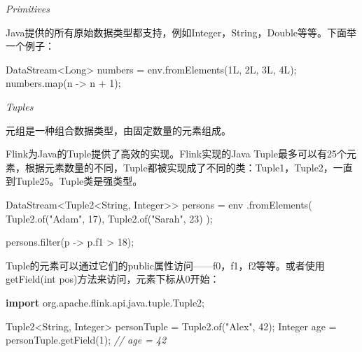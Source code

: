 \documentclass[cn,11pt,chinese]{elegantbook}
\newenvironment{Shaded}{}{}
\newcommand{\BuiltInTok}[1]{#1}
\newcommand{\CommentTok}[1]{\textcolor[rgb]{0.38,0.63,0.69}{\textit{#1}}}
\newcommand{\DecValTok}[1]{\textcolor[rgb]{0.25,0.63,0.44}{#1}}
\newcommand{\FunctionTok}[1]{\textcolor[rgb]{0.02,0.16,0.49}{#1}}
\newcommand{\ImportTok}[1]{#1}
\newcommand{\KeywordTok}[1]{\textcolor[rgb]{0.00,0.44,0.13}{\textbf{#1}}}
\newcommand{\NormalTok}[1]{#1}
\newcommand{\StringTok}[1]{\textcolor[rgb]{0.25,0.44,0.63}{#1}}
\begin{document}
\emph{Primitives}

Java提供的所有原始数据类型都支持，例如Integer，String，Double等等。下面举一个例子：

\begin{Shaded}
\begin{Highlighting}[]
\NormalTok{DataStream\textless{}}\BuiltInTok{Long}\NormalTok{\textgreater{} numbers = env.}\FunctionTok{fromElements}\NormalTok{(}\DecValTok{1L}\NormalTok{, }\DecValTok{2L}\NormalTok{, }\DecValTok{3L}\NormalTok{, }\DecValTok{4L}\NormalTok{);}
\NormalTok{numbers.}\FunctionTok{map}\NormalTok{(n {-}\textgreater{} n + }\DecValTok{1}\NormalTok{);}
\end{Highlighting}
\end{Shaded}

\emph{Tuples}

元组是一种组合数据类型，由固定数量的元素组成。

Flink为Java的Tuple提供了高效的实现。Flink实现的Java
Tuple最多可以有25个元素，根据元素数量的不同，Tuple都被实现成了不同的类：Tuple1，Tuple2，一直到Tuple25。Tuple类是强类型。

\begin{Shaded}
\begin{Highlighting}[]
\NormalTok{DataStream\textless{}Tuple2\textless{}}\BuiltInTok{String}\NormalTok{, }\BuiltInTok{Integer}\NormalTok{\textgreater{}\textgreater{} persons = env}
\NormalTok{  .}\FunctionTok{fromElements}\NormalTok{(}
\NormalTok{    Tuple2.}\FunctionTok{of}\NormalTok{(}\StringTok{"Adam"}\NormalTok{, }\DecValTok{17}\NormalTok{),}
\NormalTok{    Tuple2.}\FunctionTok{of}\NormalTok{(}\StringTok{"Sarah"}\NormalTok{, }\DecValTok{23}\NormalTok{)}
\NormalTok{  );}

\NormalTok{persons.}\FunctionTok{filter}\NormalTok{(p {-}\textgreater{} p.}\FunctionTok{f1}\NormalTok{ \textgreater{} }\DecValTok{18}\NormalTok{);}
\end{Highlighting}
\end{Shaded}

Tuple的元素可以通过它们的public属性访问------f0，f1，f2等等。或者使用getField(int
pos)方法来访问，元素下标从0开始：

\begin{Shaded}
\begin{Highlighting}[]
\KeywordTok{import}\ImportTok{ org.apache.flink.api.java.tuple.Tuple2;}

\NormalTok{Tuple2\textless{}}\BuiltInTok{String}\NormalTok{, }\BuiltInTok{Integer}\NormalTok{\textgreater{} personTuple = Tuple2.}\FunctionTok{of}\NormalTok{(}\StringTok{"Alex"}\NormalTok{, }\DecValTok{42}\NormalTok{);}
\BuiltInTok{Integer}\NormalTok{ age = personTuple.}\FunctionTok{getField}\NormalTok{(}\DecValTok{1}\NormalTok{); }\CommentTok{// age = 42}
\end{Highlighting}
\end{Shaded}
\end{document}

